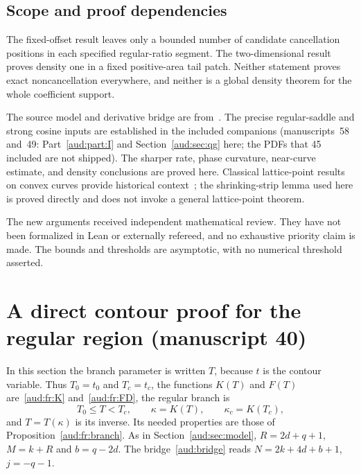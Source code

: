 \documentclass[11pt,a4paper]{article}
\numberwithin{equation}{section}
\begin{document}
\subsection{Scope and proof dependencies}
The fixed-offset result leaves only a bounded number of candidate cancellation positions in each specified regular-ratio segment. The two-dimensional result proves density one in a fixed positive-area tail patch. Neither statement proves exact noncancellation everywhere, and neither is a global density theorem for the whole coefficient support.

The source model and derivative bridge are from~\cite{source}. The precise regular-saddle and strong cosine inputs are established in the included companions (manuscripts~58 and~49: Part~\ref{aud:part:I} and Section~\ref{aud:sec:qg} here; the PDFs that 45 included are not shipped). The sharper rate, phase curvature, near-curve estimate, and density conclusions are proved here. Classical lattice-point results on convex curves provide historical context~\cite{jarnik}; the shrinking-strip lemma used here is proved directly and does not invoke a general lattice-point theorem.

The new arguments received independent mathematical review. They have not been formalized in Lean or externally refereed, and no exhaustive priority claim is made. The bounds and thresholds are asymptotic, with no numerical threshold asserted.
\section{A direct contour proof for the regular region (manuscript 40)}\label{aud:sec:dc}
In this section the branch parameter is written $T$, because $t$ is the contour variable. Thus $T_0=t_0$ and $T_c=t_c$, the functions $K(T)$ and $F(T)$ are~\eqref{aud:fr:K} and~\eqref{aud:fr:FD}, the regular branch is
\[
 T_0\le T<T_c,\qquad \kappa=K(T),\qquad \kappa_c=K(T_c),
\]
and $T=T(\kappa)$ is its inverse. Its needed properties are those of Proposition~\ref{aud:fr:branch}. As in Section~\ref{aud:sec:model}, $R=2d+q+1$, $M=k+R$ and $b=q-2d$. The bridge~\eqref{aud:bridge} reads $N=2k+4d+b+1$, $j=-q-1$.
\end{document}
